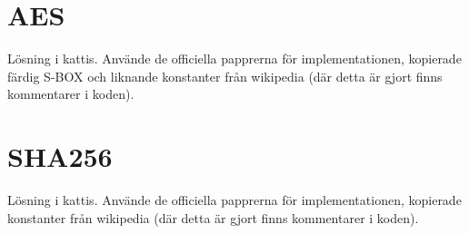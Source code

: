 \documentclass[a4paper,11pt]{article}
\begin{document}
	\section{AES}
		Lösning i kattis. Använde de officiella papprerna för implementationen, kopierade färdig S-BOX och liknande konstanter från wikipedia (där detta är gjort finns kommentarer i koden).

	\section{SHA256}
		Lösning i kattis. Använde de officiella papprerna för implementationen, kopierade konstanter från wikipedia (där detta är gjort finns kommentarer i koden).
\end{document}

